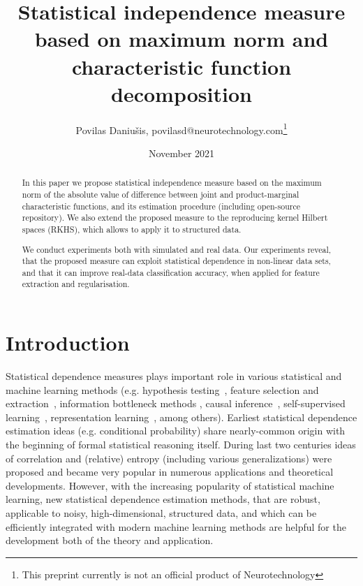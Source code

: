 \documentclass{article}
\title{Statistical independence measure based on maximum norm and characteristic function decomposition}
\author{Povilas Daniu\v{s}is, povilasd@neurotechnology.com\footnote{This preprint currently is not an official product of Neurotechnology}}
\date{November 2021}
\begin{document}
\maketitle

%

\begin{abstract}
    In this paper we propose statistical independence measure based on the maximum norm of the absolute value of difference between joint and product-marginal characteristic functions, and its estimation procedure (including open-source repository). We also extend the proposed measure to the reproducing kernel Hilbert spaces (RKHS), which allows to apply it to structured data.
    
    We conduct experiments both with simulated and real data. Our experiments reveal, that the proposed measure can exploit statistical dependence in non-linear data sets, and that it can improve real-data classification accuracy, when applied for feature extraction and regularisation.
    
\end{abstract}

\section{Introduction}
Statistical dependence measures plays important role in various statistical and machine learning methods (e.g. hypothesis testing~\cite{Gretton2005MeasuringSD}, feature selection and extraction~\cite{EigenHSIC,HSCA}, information bottleneck methods \cite{Ma2020TheHB}, causal inference~\cite{NIPS2008_f7664060}, self-supervised learning~\cite{li2021selfsupervised}, representation learning~\cite{Ragonesi2021LearningUR}, among others).  Earliest statistical dependence estimation ideas (e.g. conditional probability) share nearly-common origin with the beginning of formal statistical reasoning itself. During last two centuries ideas of correlation and (relative) entropy (including various generalizations) were proposed and became very popular in numerous applications and theoretical developments. However, with the increasing popularity of statistical machine learning, new statistical dependence estimation methods, that are robust, applicable to noisy, high-dimensional, structured data, and which can be efficiently integrated with modern machine learning methods are helpful for the development both of the theory and application.
\end{document}
